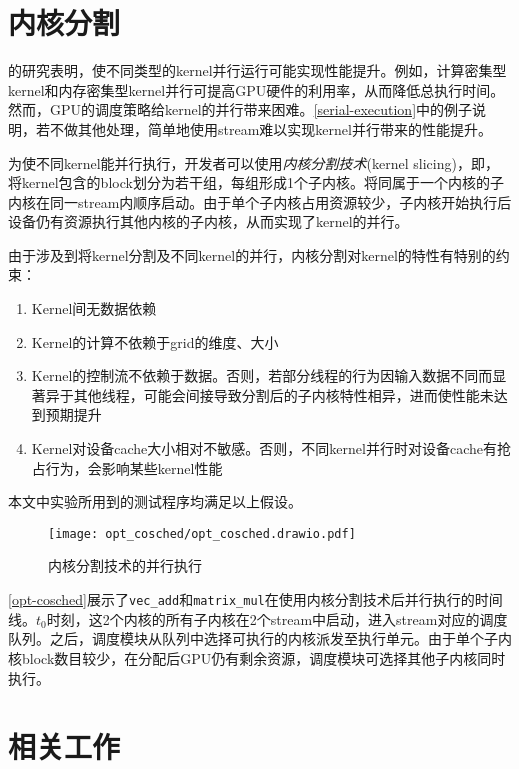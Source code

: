\section{内核分割}

\citet{10.1145_3295690}\cite{8853389}的研究表明，使不同类型的kernel并行运行可能实现性能提升。例如，计算密集型kernel和内存密集型kernel并行可提高GPU硬件的利用率，从而降低总执行时间。然而，GPU的调度策略给kernel的并行带来困难。\autoref{serial-execution}中的例子说明，若不做其他处理，简单地使用stream难以实现kernel并行带来的性能提升。

为使不同kernel能并行执行，开发者可以使用\emph{内核分割技术}(kernel slicing)，即，将kernel包含的block划分为若干组，每组形成1个子内核。将同属于一个内核的子内核在同一stream内顺序启动。由于单个子内核占用资源较少，子内核开始执行后设备仍有资源执行其他内核的子内核，从而实现了kernel的并行。

由于涉及到将kernel分割及不同kernel的并行，内核分割对kernel的特性有特别的约束：
\begin{enumerate}
    \item Kernel间无数据依赖
    \item Kernel的计算不依赖于grid的维度、大小
    \item Kernel的控制流不依赖于数据。否则，若部分线程的行为因输入数据不同而显著异于其他线程，可能会间接导致分割后的子内核特性相异，进而使性能未达到预期提升
    \item Kernel对设备cache大小相对不敏感。否则，不同kernel并行时对设备cache有抢占行为，会影响某些kernel性能
\end{enumerate}

本文中实验所用到的测试程序均满足以上假设。

\begin{figure}[htbp]
    \centering
    \texttt{[image: opt\_cosched/opt\_cosched.drawio.pdf]}
    \caption{内核分割技术的并行执行}
    \label{opt-cosched}    
\end{figure}

\autoref{opt-cosched}展示了\texttt{vec\_add}和\texttt{matrix\_mul}在使用内核分割技术后并行执行的时间线。$t_0$时刻，这2个内核的所有子内核在2个stream中启动，进入stream对应的调度队列。之后，调度模块从队列中选择可执行的内核派发至执行单元。由于单个子内核block数目较少，在分配后GPU仍有剩余资源，调度模块可选择其他子内核同时执行。




\section{相关工作}

